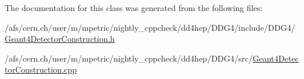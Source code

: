 The documentation for this class was generated from the following files\+:\begin{DoxyCompactItemize}
\item 
/afs/cern.\+ch/user/m/mpetric/nightly\+\_\+cppcheck/dd4hep/\+D\+D\+G4/include/\+D\+D\+G4/\hyperlink{_geant4_detector_construction_8h}{Geant4\+Detector\+Construction.\+h}\item 
/afs/cern.\+ch/user/m/mpetric/nightly\+\_\+cppcheck/dd4hep/\+D\+D\+G4/src/\hyperlink{_geant4_detector_construction_8cpp}{Geant4\+Detector\+Construction.\+cpp}\end{DoxyCompactItemize}
